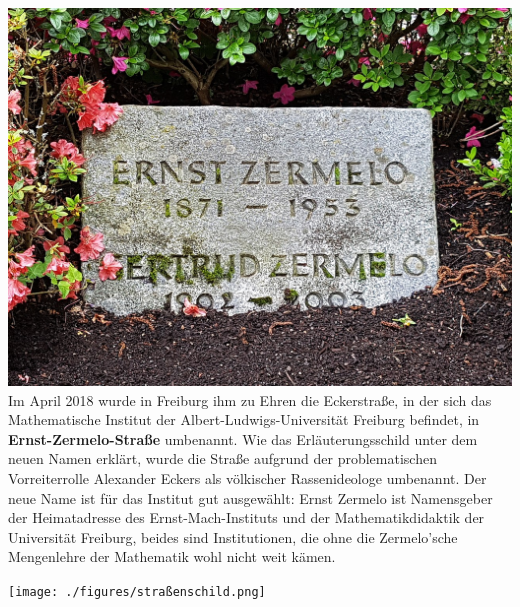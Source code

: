 \documentclass[landscape, a4paper]{article}
\newcommand\alert[1]{\textcolor{PrimaryColor}{\textbf{#1}}}
\begin{document}
\begin{minipage}[t]{0.32\textwidth}
	\vspace{0cm}
	\setlength{\parskip}{0.25cm}

	\includegraphics[width=\linewidth]{./figures/grabstein.png}
	\setlength{\parskip}{0.25cm}
	\vspace{0.15cm}
	Im April 2018 wurde in Freiburg ihm zu Ehren die Eckerstraße, in der sich das Mathematische Institut der Albert-Ludwigs-Universität Freiburg befindet, in \alert{Ernst-Zermelo-Straße} umbenannt. Wie das Erläuterungsschild unter dem neuen Namen erklärt, wurde die Straße aufgrund der problematischen Vorreiterrolle Alexander Eckers als völkischer Rassenideologe umbenannt. Der neue Name ist für das Institut gut ausgewählt: Ernst Zermelo ist Namensgeber der Heimatadresse des Ernst-Mach-Instituts und der Mathematikdidaktik der Universität Freiburg, beides sind Institutionen, die ohne die Zermelo’sche Mengenlehre der Mathematik wohl nicht weit kämen. %

	\texttt{[image: ./figures/straßenschild.png]}
	\setlength{\parskip}{0.25cm}
	\vspace{0.15cm}
\end{minipage}
\hspace{0.4cm}
\end{document}
